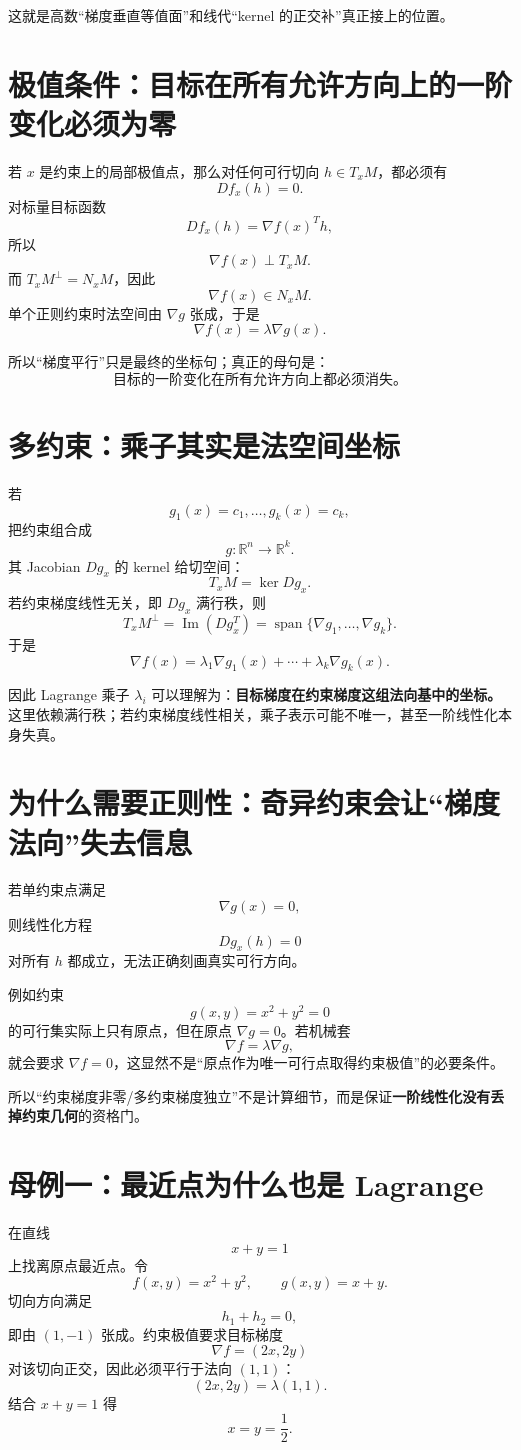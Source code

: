 \documentclass[profile=standard]{ipara-handbook}
\begin{document}
这就是高数“梯度垂直等值面”和线代“kernel 的正交补”真正接上的位置。

\section{极值条件：目标在所有允许方向上的一阶变化必须为零}
若 $x$ 是约束上的局部极值点，那么对任何可行切向 $h\in T_xM$，都必须有
\[
Df_x(h)=0.
\]
对标量目标函数
\[
Df_x(h)=\nabla f(x)^Th,
\]
所以
\[
\nabla f(x)\perp T_xM.
\]
而 $T_xM^\perp=N_xM$，因此
\[
\boxed{\nabla f(x)\in N_xM.}
\]
单个正则约束时法空间由 $\nabla g$ 张成，于是
\[
\boxed{\nabla f(x)=\lambda\nabla g(x).}
\]

所以“梯度平行”只是最终的坐标句；真正的母句是：
\[
\boxed{\text{目标的一阶变化在所有允许方向上都必须消失。}}
\]

\section{多约束：乘子其实是法空间坐标}
若
\[
g_1(x)=c_1,\dots,g_k(x)=c_k,
\]
把约束组合成
\[
g:\mathbb R^n\to\mathbb R^k.
\]
其 Jacobian $Dg_x$ 的 kernel 给切空间：
\[
T_xM=\ker Dg_x.
\]
若约束梯度线性无关，即 $Dg_x$ 满行秩，则
\[
T_xM^\perp=\operatorname{Im}(Dg_x^T)
=\operatorname{span}\{\nabla g_1,\dots,\nabla g_k\}.
\]
于是
\[
\boxed{
\nabla f(x)
=\lambda_1\nabla g_1(x)+\cdots+\lambda_k\nabla g_k(x).
}
\]

因此 Lagrange 乘子 $\lambda_i$ 可以理解为：\textbf{目标梯度在约束梯度这组法向基中的坐标。}这里依赖满行秩；若约束梯度线性相关，乘子表示可能不唯一，甚至一阶线性化本身失真。

\section{为什么需要正则性：奇异约束会让“梯度法向”失去信息}
若单约束点满足
\[
\nabla g(x)=0,
\]
则线性化方程
\[
Dg_x(h)=0
\]
对所有 $h$ 都成立，无法正确刻画真实可行方向。

例如约束
\[
g(x,y)=x^2+y^2=0
\]
的可行集实际上只有原点，但在原点 $\nabla g=0$。若机械套
\[
\nabla f=\lambda\nabla g,
\]
就会要求 $\nabla f=0$，这显然不是“原点作为唯一可行点取得约束极值”的必要条件。

所以“约束梯度非零/多约束梯度独立”不是计算细节，而是保证\textbf{一阶线性化没有丢掉约束几何}的资格门。

\section{母例一：最近点为什么也是 Lagrange}
在直线
\[
x+y=1
\]
上找离原点最近点。令
\[
f(x,y)=x^2+y^2,
\qquad g(x,y)=x+y.
\]
切向方向满足
\[
h_1+h_2=0,
\]
即由 $(1,-1)$ 张成。约束极值要求目标梯度
\[
\nabla f=(2x,2y)
\]
对该切向正交，因此必须平行于法向 $(1,1)$：
\[
(2x,2y)=\lambda(1,1).
\]
结合 $x+y=1$ 得
\[
x=y=\frac12.
\]
\end{document}
